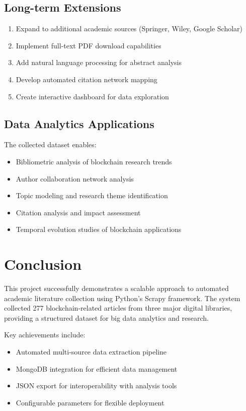 \documentclass[12pt,a4paper]{article}
\begin{document}
\subsection{Long-term Extensions}
\begin{enumerate}
    \item Expand to additional academic sources (Springer, Wiley, Google Scholar)
    \item Implement full-text PDF download capabilities
    \item Add natural language processing for abstract analysis
    \item Develop automated citation network mapping
    \item Create interactive dashboard for data exploration
\end{enumerate}

\subsection{Data Analytics Applications}
The collected dataset enables:
\begin{itemize}
    \item Bibliometric analysis of blockchain research trends
    \item Author collaboration network analysis
    \item Topic modeling and research theme identification
    \item Citation analysis and impact assessment
    \item Temporal evolution studies of blockchain applications
\end{itemize}

\section{Conclusion}

This project successfully demonstrates a scalable approach to automated academic literature collection using Python's Scrapy framework. The system collected 277 blockchain-related articles from three major digital libraries, providing a structured dataset for big data analytics and research.

Key achievements include:
\begin{itemize}
    \item Automated multi-source data extraction pipeline
    \item MongoDB integration for efficient data management
    \item JSON export for interoperability with analysis tools
    \item Configurable parameters for flexible deployment
\end{itemize}
\end{document}
